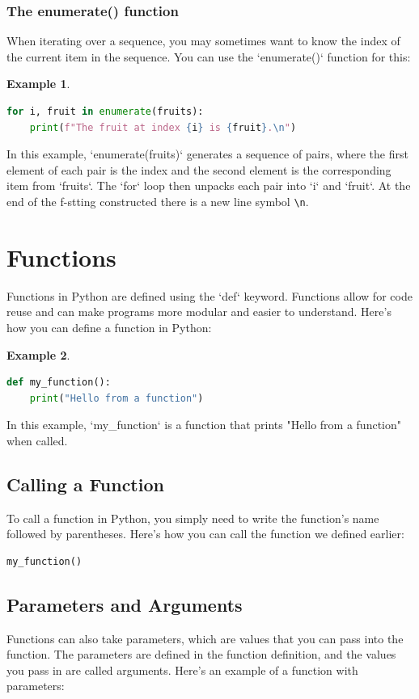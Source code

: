\documentclass[12pt]{article}
\newtheorem{Example}{Example}[section]
\begin{document}
\subsubsection{The enumerate() function}
When iterating over a sequence, you may sometimes want to know the index of the current item in the sequence. You can use the `enumerate()` function for this:
\begin{Example}
\begin{lstlisting}[language=Python]
for i, fruit in enumerate(fruits):
    print(f"The fruit at index {i} is {fruit}.\n")
\end{lstlisting}
\end{Example}
In this example, `enumerate(fruits)` generates a sequence of pairs, where the first element of each pair is the index and the second element is the corresponding item from `fruits`. The `for` loop then unpacks each pair into `i` and `fruit`. At the end of the f-stting constructed there is a new line symbol  \texttt{\textbackslash n}.

\newpage
\section{Functions}

Functions in Python are defined using the `def` keyword. Functions allow for code reuse and can make programs more modular and easier to understand. Here's how you can define a function in Python:
\begin{Example}
\begin{lstlisting}[language=Python]
def my_function():
    print("Hello from a function")
\end{lstlisting}
\end{Example}
In this example, `my_function` is a function that prints "Hello from a function" when called.


\subsection{Calling a Function}
To call a function in Python, you simply need to write the function's name followed by parentheses. Here's how you can call the function we defined earlier:
\begin{lstlisting}[language=Python]
my_function()
\end{lstlisting}

\subsection{Parameters and Arguments}
Functions can also take parameters, which are values that you can pass into the function. The parameters are defined in the function definition, and the values you pass in are called arguments. Here's an example of a function with parameters:
\end{document}
